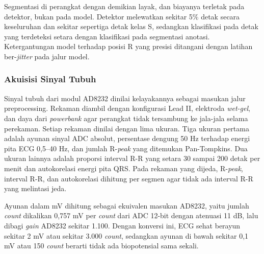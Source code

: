 Segmentasi di perangkat dengan demikian layak, dan biayanya terletak pada detektor, bukan pada model. Detektor melewatkan sekitar 5\% detak secara keseluruhan dan sekitar sepertiga detak kelas S, sedangkan klasifikasi pada detak yang terdeteksi setara dengan klasifikasi pada segmentasi anotasi. Ketergantungan model terhadap posisi R yang presisi ditangani dengan latihan ber-\textit{jitter} pada jalur model.

\subsubsection{Akuisisi Sinyal Tubuh}

Sinyal tubuh dari modul AD8232 dinilai kelayakannya sebagai masukan jalur preprocessing. Rekaman diambil dengan konfigurasi Lead II, elektroda \textit{wet-gel}, dan daya dari \textit{powerbank} agar perangkat tidak tersambung ke jala-jala selama perekaman. Setiap rekaman dinilai dengan lima ukuran. Tiga ukuran pertama adalah ayunan sinyal ADC absolut, persentase dengung 50 Hz terhadap energi pita ECG 0,5--40 Hz, dan jumlah R-\textit{peak} yang ditemukan Pan-Tompkins. Dua ukuran lainnya adalah proporsi interval R-R yang setara 30 sampai 200 detak per menit dan autokorelasi energi pita QRS. Pada rekaman yang dijeda, R-\textit{peak}, interval R-R, dan autokorelasi dihitung per segmen agar tidak ada interval R-R yang melintasi jeda.

Ayunan dalam mV dihitung sebagai ekuivalen masukan AD8232, yaitu jumlah \textit{count} dikalikan 0,757 mV per \textit{count} dari ADC 12-bit dengan atenuasi 11 dB, lalu dibagi \textit{gain} AD8232 sekitar 1.100. Dengan konversi ini, ECG sehat berayun sekitar 2 mV atau sekitar 3.000 \textit{count}, sedangkan ayunan di bawah sekitar 0,1 mV atau 150 \textit{count} berarti tidak ada biopotensial sama sekali.

